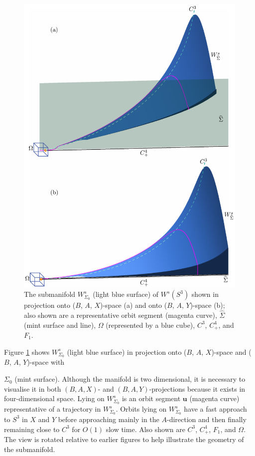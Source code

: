 \documentclass{ws-ijbc}
\begin{document}
\begin{figure}[H]
\centering
\includegraphics[]{./figures/MKMO_4.pdf}
\caption{The submanifold $W^{s}_{\Sigma_0}$ (light blue surface) of $W^s(S^3)$ shown in projection onto ($B$, $A$, $X$)-space (a) and onto ($B$, $A$, $Y$)-space (b); also shown are a representative orbit segment (magenta curve), $\widehat{\Sigma}$ (mint surface and line), $\Omega$ (represented by a blue cube), $C^3$, $C^4_+$, and $F_1$.}
\label{figure_4}
\end{figure}

Figure \ref{figure_4} shows $W^s_{\Sigma_0}$ (light blue surface) in projection onto ($B$, $A$, $X$)-space and ($B$, $A$, $Y$)-space with 

\noindent
$\Sigma_0$ (mint surface).  Although the manifold is two dimensional, it is necessary to visualise it in both $(B,A,X)$- and $(B,A,Y)$-projections because it exists in four-dimensional space.  Lying on $W^s_{\Sigma_0}$ is an orbit segment $\mathbf{u}$ (magenta curve) representative of a trajectory in $W^s_{\Sigma_0}$.  Orbits lying on $W^s_{\Sigma_0}$ have a fast approach to $S^3$ in $X$ and $Y$ before approaching mainly in the $A$-direction and then finally remaining close to $C^3$ for $O(1)$ slow time.  Also shown are $C^3$, $C^4_+$, $F_1$, and $\Omega$.  The view is rotated relative to earlier figures to help illustrate the geometry of the submanifold.
\end{document}
